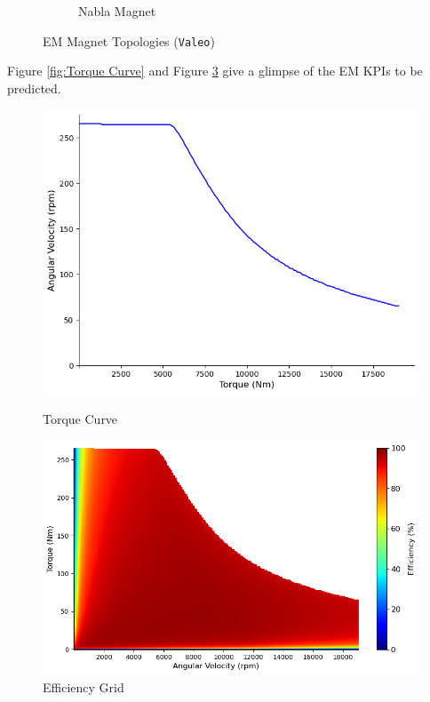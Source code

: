 \documentclass{report} %
\begin{document}
\begin{figure}[H]
\begin{subfigure}{0.32\textwidth}
        \caption{Nabla Magnet}
        \label{fig:Nabla Magnet}
    \end{subfigure}
    \caption{\ac{EM} Magnet Topologies (\texttt{Valeo})}
    \label{fig:EM Magnet Topologies}
\end{figure}

Figure \ref{fig:Torque Curve} and Figure \ref{fig:Efficiency Grid} give a glimpse of the \ac{EM} \ac{KPI}s to be predicted.
\begin{figure}[H]
    \centering
    \begin{minipage}[b]{0.44\textwidth}
        \centering
        \includegraphics[width=\textwidth]{./ReportImages/TorqueCurve.png}
        \caption{Torque Curve} %
        \label{fig:Torque Curve}
    \end{minipage}
    \hfill
    \begin{minipage}[b]{0.54\textwidth}
        \centering
        \includegraphics[width=\textwidth]{./ReportImages/EfficiencyGrid.png}
        \caption{Efficiency Grid}
        \label{fig:Efficiency Grid}
    \end{minipage}
\end{figure}
\end{document}
